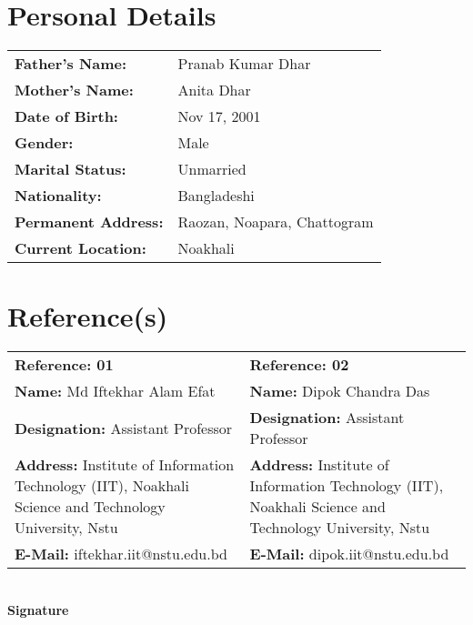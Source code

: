 \documentclass[11pt,a4paper]{article}
\begin{document}
\section*{Personal Details}
\begin{tabular}{ll}
\textbf{Father's Name:}       & Pranab Kumar Dhar \\
\textbf{Mother's Name:}       & Anita Dhar \\
\textbf{Date of Birth:}       & Nov 17, 2001 \\
\textbf{Gender:}              & Male \\
\textbf{Marital Status:}      & Unmarried \\
\textbf{Nationality:}         & Bangladeshi \\
\textbf{Permanent Address:}   & Raozan, Noapara, Chattogram \\
\textbf{Current Location:}    & Noakhali \\
\end{tabular}



\section*{Reference(s)}
\begin{tabularx}{\textwidth}{X X}
\textbf{Reference: 01} & \textbf{Reference: 02} \\
\textbf{Name:} Md Iftekhar Alam Efat & \textbf{Name:} Dipok Chandra Das \\
\textbf{Designation:} Assistant Professor & \textbf{Designation:} Assistant Professor \\
\textbf{Address:} Institute of Information Technology (IIT), Noakhali Science and Technology University, Nstu & \textbf{Address:} Institute of Information Technology (IIT), Noakhali Science and Technology University, Nstu \\
\textbf{E-Mail:} iftekhar.iit@nstu.edu.bd & \textbf{E-Mail:} dipok.iit@nstu.edu.bd \\
\end{tabularx}

\begin{flushright}
     \\
    \textbf{Signature}
\end{flushright}
\end{document}

